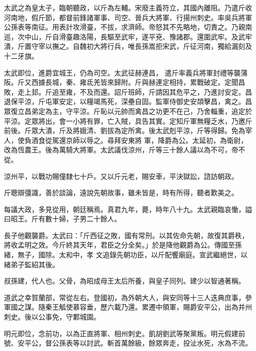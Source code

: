 \begin{pinyinscope}
 太武之為皇太子，臨朝聽政，以斤為左輔。宋廢主義符立，其國內離阻。乃遣斤收河南地，假斤節，都督前鋒諸軍事、司空、晉兵大將軍、行揚州刺史。率吳兵將軍公孫表等南征。用表計攻滑臺，不拔，求濟師。帝怒其不先略地，切責之。乃親南巡，次中山，斤自滑臺趣洛陽，長驅至武牢，遂平兗、豫諸郡。還圍武牢。及武牢潰，斤置守宰以撫之。自魏初大將行兵，唯長孫嵩拒宋武，斤征河南，獨給漏刻及十二牙旗。



 太武即位，進爵宜城王，仍為司空。太武征赫連昌，
 遣斤率義兵將軍封禮等襲蒲阪。斤又西據長城，秦、雍氐羌皆來歸附。斤與赫連定相持，累戰破定。定聞昌敗，走上邽。斤追至雍，不及而還。詔斤班師，斤請因其危平之，乃進討安定。昌退保平涼，斤屯軍安定，以糧竭馬死，深壘自固。監軍侍御史安頡擊昌，禽之。昌眾復立昌弟定為主，守平涼。斤恥以元帥而禽昌之功更不在己，乃舍輜重，追定於平涼。定眾將出，會一小將有罪，亡入賊，具告其實。定知斤軍無糧乏水，乃邀斤前後。斤眾大潰，斤及將娥清、劉拔為定所禽。後太武剋平涼，斤等得歸。免為宰人，使負酒食從駕還京師以辱之。尋拜安東將
 軍，降爵為公。太延初，為衛尉，改為恆農王。後為萬騎大將軍。太武議伐涼州，斤等三十餘人議以為不可，帝不從。



 涼州平，以戰功賜僮隸七十戶。又以斤元老，賜安車，平決獄訟，諮訪朝政。



 斤聰辯彊識，善於談論，遠說先朝故事，雖未皆是，時有所得，聽者歎美之。



 每議大政，多見從用，朝廷稱焉。真君九年，薨，時年八十九。太武親臨哀慟，謚曰昭王。斤有數十婦，子男二十餘人。



 長子他觀襲爵。太武曰：「斤西征之敗，國有常刑。以其佐命先朝，故復其爵秩，將收孟明之效。今斤終其天年，君臣之分全矣。」於是降他觀爵為公。傳國至孫緒，無子，國除。太和中，孝
 文追錄先朝功臣，以斤配饗廟庭。宣武繼絕世，以緒弟子監紹其後。



 叔孫建，代人也。父骨，為昭成母王太后所養，與皇子同列。建少以智通著稱。



 道武之幸賀蘭部，常從左右。登國初，為外朝大人，與安同等十三人迭典庶事，參軍國之謀。隨秦王觚使慕容垂，歷六載乃還。累遷中領軍，賜爵安平公，出為并州刺史。後以公事免，守鄴城園。



 明元即位，念前功，以為正直將軍、相州刺史。飢胡劉武等聚黨叛。明元假建前號、安平公，督公孫表等以討武。斬首萬餘級，餘眾奔走，投沚水死，水為不流。




\end{pinyinscope}
